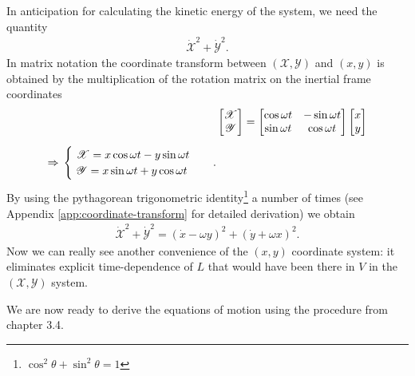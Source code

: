 In anticipation for calculating the kinetic energy of the system, we need the quantity
\begin{align}
\dot{\mathscr{X}}^2 + \dot{\mathscr{Y}}^2.
\end{align}
In matrix notation the coordinate transform between $(\mathscr{X},\mathscr{Y})$ and $(x,y)$ is obtained by the multiplication of the rotation matrix on the inertial frame coordinates
\begin{align}
\notag &\begin{bmatrix}
  \mathscr{X} \\
  \mathscr{Y}
\end{bmatrix}
=
\begin{bmatrix}
  \cos{\omega t} & -\sin{\omega t} \\
  \sin{\omega t} & \cos{\omega t}
\end{bmatrix}
\begin{bmatrix}
  x \\
  y
\end{bmatrix} \\[0.2cm]
\label{eq:coordinate-transform}
\Rightarrow
\begin{split}
&\begin{cases}
\ \mathscr{X} = x\cos{\omega t} - y\sin{\omega t} \\
\ \mathscr{Y} = x\sin{\omega t} + y\cos{\omega t}
\end{cases}
\end{split}.
\end{align}
By using the pythagorean trigonometric identity\footnote{$\cos^2{\theta} + \sin^2{\theta} = 1$} a number of times (see Appendix \ref{app:coordinate-transform} for detailed derivation) we obtain
\begin{align}
\mathscr{\dot{\mathscr{X}}}^2 + \mathscr{\dot{\mathscr{Y}}}^2 = (\dot{x}-\omega y)^2 + (\dot{y}+\omega x)^2.
\end{align}
Now we can really see another convenience of the $(x,y)$ coordinate system: it eliminates explicit time-dependence of $L$ that would have been there in $V$ in the $(\mathscr{X},\mathscr{Y})$ system.

We are now ready to derive the equations of motion using the procedure from chapter 3.4.
